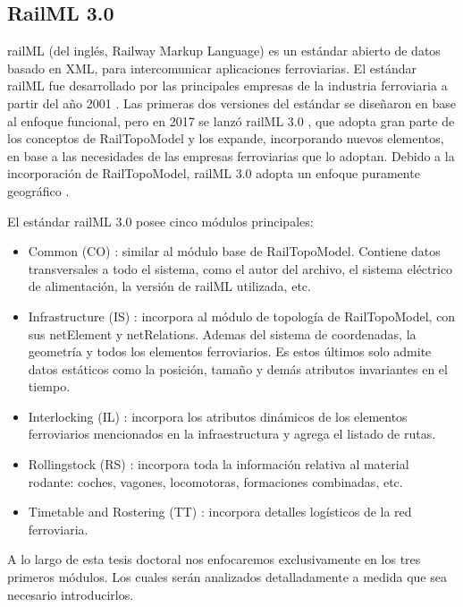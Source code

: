 \subsection{RailML 3.0}

	railML \cite{RAILML_0,Paper_107,Paper_112,Paper_150,Paper_159} (del inglés, Railway Markup Language) es un estándar abierto de datos basado en XML, para intercomunicar aplicaciones ferroviarias. El estándar railML fue desarrollado por las principales empresas de la industria ferroviaria a partir del año 2001 \cite{Paper_159}. Las primeras dos versiones del estándar se diseñaron en base al enfoque funcional, pero en 2017 se lanzó railML 3.0 \cite{RAILML_0,Paper_146,Paper_150}, que adopta gran parte de los conceptos de RailTopoModel y los expande, incorporando nuevos elementos, en base a las necesidades de las empresas ferroviarias que lo adoptan. Debido a la incorporación de RailTopoModel, railML 3.0 adopta un enfoque puramente geográfico \cite{Paper_150}.
	
	El estándar railML 3.0 posee cinco módulos principales:
	

    \begin{itemize}
        \item Common (CO) \cite{RAILML_CO}: similar al módulo base de RailTopoModel. Contiene datos transversales a todo el sistema, como el autor del archivo, el sistema eléctrico de alimentación, la versión de railML utilizada, etc.
        \item Infrastructure (IS) \cite{RAILML_IS}: incorpora al módulo de topología de RailTopoModel, con sus netElement y netRelations. Ademas del sistema de coordenadas, la geometría y todos los elementos ferroviarios. Es estos últimos solo admite datos estáticos como la posición, tamaño y demás atributos invariantes en el tiempo.
        \item Interlocking (IL) \cite{RAILML_IL}: incorpora los atributos dinámicos de los elementos ferroviarios mencionados en la infraestructura y agrega el listado de rutas.
        \item Rollingstock (RS) \cite{RAILML_RS}: incorpora toda la información relativa al material rodante: coches, vagones, locomotoras, formaciones combinadas, etc.
        \item Timetable and Rostering (TT) \cite{RAILML_TT}: incorpora detalles logísticos de la red ferroviaria.
    \end{itemize}

    A lo largo de esta tesis doctoral nos enfocaremos exclusivamente en los tres primeros módulos. Los cuales serán analizados detalladamente a medida que sea necesario introducirlos.